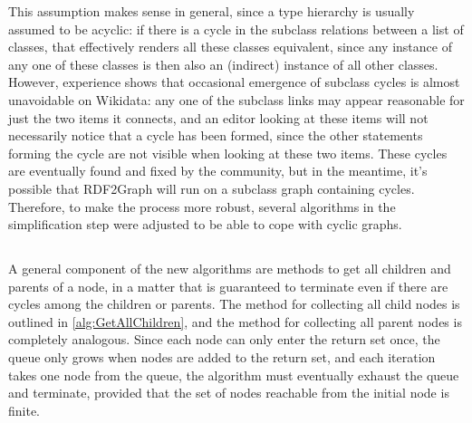 This assumption makes sense in general,
since a type hierarchy is usually assumed to be acyclic:
if there is a cycle in the subclass relations between a list of classes,
that effectively renders all these classes equivalent,
since any instance of any one of these classes is then also an (indirect) instance of all other classes.
However, experience shows %
that occasional emergence of subclass cycles is almost unavoidable on \gls{Wikidata}:
any one of the subclass links may appear reasonable for just the two \glspl{item} it connects,
and an editor looking at these \glspl{item} will not necessarily notice that a cycle has been formed,
since the other statements forming the cycle are not visible when looking at these two \glspl{item}.
These cycles are eventually found and fixed by the community,
but in the meantime, it’s possible that \gls{RDF2Graph} will run on a subclass graph containing cycles.
Therefore, to make the process more robust, %
several algorithms in the simplification step were adjusted to be able to cope with cyclic graphs.

\subsection{}
\label{subsec:RDF2Graph+Wikidata:cyclic-graphs:GetAllChildren}

A general component of the new algorithms are methods to get all children and parents of a node,
in a matter that is guaranteed to terminate even if there are cycles among the children or parents.
The method for collecting all child nodes is outlined in \cref{alg:GetAllChildren},
and the method for collecting all parent nodes is completely analogous.
Since each node can only enter the return set once,
the queue only grows when nodes are added to the return set,
and each iteration takes one node from the queue,
the algorithm must eventually exhaust the queue and terminate,
provided that the set of nodes reachable from the initial node is finite.

